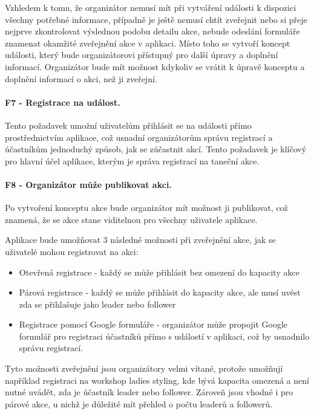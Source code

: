 Vzhledem k tomu, že organizátor nemusí mít při vytváření události k dispozici všechny potřebné informace, případně je ještě nemusí chtít zveřejnit nebo si přeje nejprve zkontrolovat výslednou podobu detailu akce, nebude odeslání formuláře znamenat okamžité zveřejnění akce v aplikaci. Místo toho se vytvoří koncept události, který bude organizátorovi přístupný pro další úpravy a doplnění informací.
Organizátor bude mít možnost kdykoliv se vrátit k úpravě konceptu a doplnění informací o akci, než ji zveřejní.

\paragraph{F7 - Registrace na událost.}\label{req:F7}
Tento požadavek umožní uživatelům přihlásit se na události přímo prostřednictvím aplikace, což usnadní organizátorům správu registrací a účastníkům jednoduchý způsob, jak se zúčastnit akcí. Tento požadavek je klíčový pro hlavní účel aplikace, kterým je správa registrací na taneční akce.

\paragraph{F8 - Organizátor může publikovat akci.}\label{req:F8}
Po vytvoření konceptu akce bude organizátor mít možnost ji publikovat, což znamená, že se akce stane viditelnou pro všechny uživatele aplikace.

Aplikace bude umožňovat 3 následné možnosti při zveřejnění akce, jak se uživatelé mohou registrovat na akci:
\begin{itemize}
    \item Otevřená registrace - každý se může přihlásit bez omezení do kapacity akce
    \item Párová registrace - každý se může přihlásit do kapacity akce, ale musí uvést zda se přihlašuje jako leader nebo follower
    \item Registrace pomocí Google formuláře - organizátor může propojit Google formulář pro registraci účastníků přímo s událostí v aplikaci, což by usnadnilo správu registrací.
\end{itemize} 

Tyto možnosti zveřejnění jsou organizátory velmi vítané, protože umožňují například registraci na workshop ladies styling, kde bývá kapacita omezená a není nutné uvádět, zda je účastník leader nebo follower. Zároveň jsou vhodné i pro párové akce, u nichž je důležité mít přehled o počtu leaderů a followerů.

